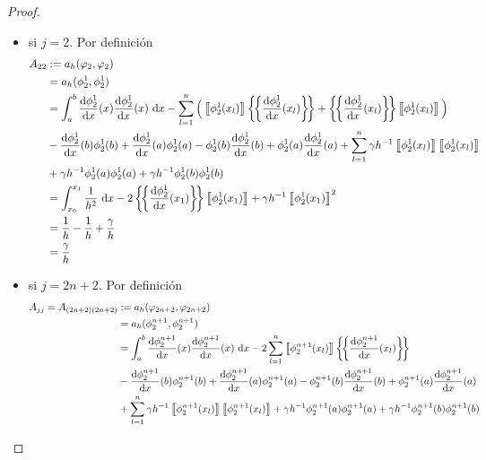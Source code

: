 \documentclass[10pt,a4paper]{report}
\newcommand{\dx}{\textup{d}x}
\providecommand{\Dx}[1]{\frac{\textup{d} #1}{\textup{d}x}}
\providecommand{\salto}[1]{\left\llbracket#1\right\rrbracket}
\providecommand{\prom}[1]{\left \{\!\left \{#1\right \}\!\right \}}
\begin{document}
\begin{proof}
\begin{itemize}
\begin{itemize}
        	    \item si $j = 2$. Por definición
        	    \begin{align*}
        	    	A_{22} &:= a_{h}(\varphi_{2},\varphi_{2})\\ 
        	    	&= a_{h}(\phi^{1}_{2},\phi^{1}_{2})\\
        	    	&= \int_{a}^{b} \Dx{\phi^{1}_{2}}(x)\Dx{\phi^{1}_{2}}(x)\ \dx - \sum_{l=1}^{n}\Big(\salto{\phi^{1}_{2}(x_{l})}\prom{\Dx{\phi^{1}_{2}}(x_{l})} + \prom{\Dx{\phi^{1}_{2}}(x_{l})}\salto{\phi^{1}_{2}(x_{l})}\Big)\\
        	    	&-\Dx{\phi^{1}_{2}}(b)\phi^{1}_{2}(b) + \Dx{\phi^{1}_{2}}(a)\phi^{1}_{2}(a) - \phi^{1}_{2}(b)\Dx{\phi^{1}_{2}}(b) + \phi^{1}_{2}(a)\Dx{\phi^{1}_{2}}(a) + \sum_{l=1}^{n}\gamma h^{-1}\salto{\phi^{1}_{2}(x_{l})}\salto{\phi^{1}_{2}(x_{l})}\\
        	    	&+ \gamma h^{-1}\phi^{1}_{2}(a)\phi^{1}_{2}(a) + \gamma h^{-1}\phi^{1}_{2}(b)\phi^{1}_{2}(b)\\
        	    	&= \int_{x_{0}}^{x_{1}}\frac{1}{h^{2}}\ \dx - 2\prom{\Dx{\phi^{1}_{2}}(x_{1})}\salto{\phi^{1}_{2}(x_{1})} + \gamma h^{-1}\salto{\phi^{1}_{2}(x_{1})}^{2} \\
        	    	&= \frac{1}{h}- \frac{1}{h}  + \frac{\gamma}{h}\\
        	    	&= \frac{\gamma}{h}
        	    \end{align*}
                \item si $j = 2n+2$. Por definición
                \begin{align*}
                	A_{jj} = A_{(2n+2)(2n+2)} &:= a_{h}(\varphi_{2n+2},\varphi_{2n+2})\\
                	                 &= a_{h}(\phi^{n+1}_{2},\phi^{n+1}_{2})\\
                	                 &= \int_{a}^{b} \Dx{\phi^{n+1}_{2}}(x)\Dx{\phi^{n+1}_{2}}(x)\ \dx - 2\sum_{l=1}^{n}\salto{\phi^{n+1}_{2}(x_{l})}\prom{\Dx{\phi^{n+1}_{2}}(x_{l})}\\
                	                 &-\Dx{\phi^{n+1}_{2}}(b)\phi^{n+1}_{2}(b) + \Dx{\phi^{n+1}_{2}}(a)\phi^{n+1}_{2}(a) - \phi^{n+1}_{2}(b)\Dx{\phi^{n+1}_{2}}(b) + \phi^{n+1}_{2}(a)\Dx{\phi^{n+1}_{2}}(a)\\ &+ \sum_{l=1}^{n}\gamma h^{-1}\salto{\phi^{n+1}_{2}(x_{l})}\salto{\phi^{n+1}_{2}(x_{l})}
                	                 + \gamma h^{-1}\phi^{n+1}_{2}(a)\phi^{n+1}_{2}(a) + \gamma h^{-1}\phi^{n+1}_{2}(b)\phi^{n+1}_{2}(b)\\

\end{align*}
\end{itemize}
\end{itemize}
\end{proof}
\end{document}
